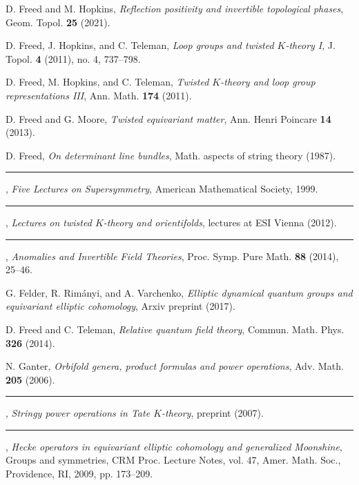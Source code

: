 \begin{description}[leftmargin=5.6em,labelwidth=5.2em,labelsep=0.4em,itemsep=0.5ex,parsep=0pt,topsep=0.8ex]
\item[\textbf{[FH21]}] D. Freed and M. Hopkins, \textit{Reflection positivity and invertible topological phases}, Geom. Topol. \textbf{25} (2021).
\item[\textbf{[FHT11a]}] D. Freed, J. Hopkins, and C. Teleman, \textit{Loop groups and twisted $K$-theory I}, J. Topol. \textbf{4} (2011), no. 4, 737--798.
\item[\textbf{[FHT11b]}] D. Freed, M. Hopkins, and C. Teleman, \textit{Twisted $K$-theory and loop group representations III}, Ann. Math. \textbf{174} (2011).
\item[\textbf{[FM13]}] D. Freed and G. Moore, \textit{Twisted equivariant matter}, Ann. Henri Poincare \textbf{14} (2013).
\item[\textbf{[Fre87]}] D. Freed, \textit{On determinant line bundles}, Math. aspects of string theory (1987).
\item[\textbf{[Fre99]}] \rule[0.45ex]{2.6em}{0.45pt}, \textit{Five Lectures on Supersymmetry}, American Mathematical Society, 1999.
\item[\textbf{[Fre12]}] \rule[0.45ex]{2.6em}{0.45pt}, \textit{Lectures on twisted $K$-theory and orientifolds}, lectures at ESI Vienna (2012).
\item[\textbf{[Fre14]}] \rule[0.45ex]{2.6em}{0.45pt}, \textit{Anomalies and Invertible Field Theories}, Proc. Symp. Pure Math. \textbf{88} (2014), 25--46.
\item[\textbf{[FRV17]}] G. Felder, R. Rim\'anyi, and A. Varchenko, \textit{Elliptic dynamical quantum groups and equivariant elliptic cohomology}, Arxiv preprint (2017).
\item[\textbf{[FT14]}] D. Freed and C. Teleman, \textit{Relative quantum field theory}, Commun. Math. Phys. \textbf{326} (2014).
\item[\textbf{[Gan06]}] N. Ganter, \textit{Orbifold genera, product formulas and power operations}, Adv. Math. \textbf{205} (2006).
\item[\textbf{[Gan07]}] \rule[0.45ex]{2.6em}{0.45pt}, \textit{Stringy power operations in Tate $K$-theory}, preprint (2007).
\item[\textbf{[Gan09]}] \rule[0.45ex]{2.6em}{0.45pt}, \textit{Hecke operators in equivariant elliptic cohomology and generalized Moonshine}, Groups and symmetries, CRM Proc. Lecture Notes, vol. 47, Amer. Math. Soc., Providence, RI, 2009, pp. 173--209.


\end{description}
